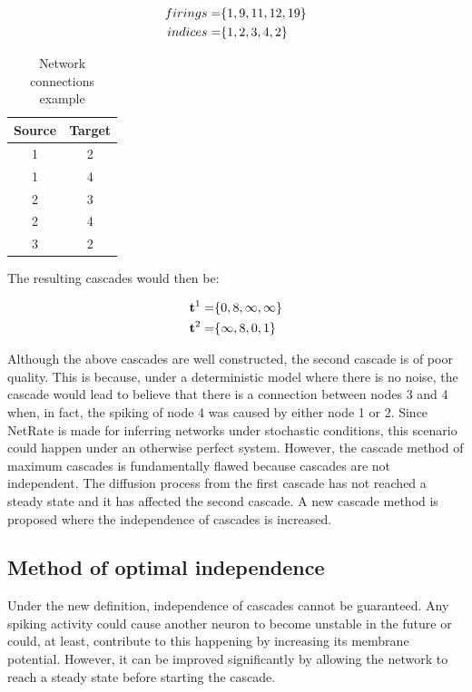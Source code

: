 \begin{align}
	\centering
	firings = &\{1, 9, 11, 12, 19\}\\
	indices = &\{1, 2,  3,  4, 2\}
	\label{eq:quality_cascades}
\end{align}

\begin{table}[H]
\centering
\begin{tabular}{|c|c|}
\hline
Source & Target \\ \hline
1      & 2      \\ \hline
1      & 4      \\ \hline
2      & 3      \\ \hline
2      & 4      \\ \hline
3      & 2      \\ \hline
\end{tabular}
\caption{Network connections example}
\label{tab:quality_cascades}
\end{table}

The resulting cascades would then be:

\begin{align}
	\centering
	\textbf{t}^{1} = &\{0, 8, \infty, \infty \}\\
	\textbf{t}^{2} = &\{\infty, 8, 0, 1 \}
\end{align}

Although the above cascades are well constructed, the second cascade is of poor quality. This is because, under a deterministic model where there is no noise, the cascade would lead to believe that there is a connection between nodes 3 and 4 when, in fact, the spiking of node 4 was caused by either node 1 or 2. Since NetRate is made for inferring networks under stochastic conditions, this scenario could happen under an otherwise perfect system. However, the cascade method of maximum cascades is fundamentally flawed because cascades are not independent. The diffusion process from the first cascade has not reached a steady state and it has affected the second cascade. A new cascade method is proposed where the independence of cascades is increased. 



\subsection{Method of optimal independence}\label{sec:optimal_independence}

Under the new definition, independence of cascades cannot be guaranteed. Any spiking activity could cause another neuron to become unstable in the future or could, at least, contribute to this happening by increasing its membrane potential. However, it can be improved significantly by allowing the network to reach a steady state before starting the cascade.\\

